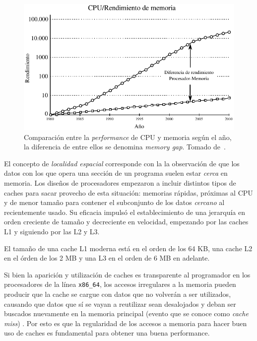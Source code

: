 \begin{figure}[htbp]
    \centering
    \includegraphics[width=\plotwidth]{images/cpu_vs_memory_ES.pdf}
    \caption{Comparaci\'on entre la \textit{performance} de CPU y memoria seg\'un el a\~no, la diferencia de entre ellos se denomina \textit{memory gap}. Tomado de~\cite{HennessyPatterson}.}
    \label{fig:cpu_vs_mem}
\end{figure}

El concepto de \textit{localidad espacial} corresponde con la la observaci\'on de que los datos con los que opera una secci\'on de un programa suelen estar \emph{cerca} en memoria.
Los dise\~nos de procesadores empezaron a incluir distintos tipos de caches para sacar provecho de esta situaci\'on: memorias r\'apidas, pr\'oximas al CPU y de menor tama\~no para contener el subconjunto de los datos \emph{cercano} al recientemente usado.
Su eficacia impuls\'o el establecimiento de una jerarqu\'ia en orden creciente de tama\~no y decreciente en velocidad, empezando por las caches L1 y siguiendo por las L2 y L3.

El tama\~no de una cache L1 moderna est\'a en el orden de los 64 KB, una cache L2 en el \'orden de los 2 MB y una L3 en el orden de 6 MB en adelante.

Si bien la aparici\'on y utilizaci\'on de caches es transparente al programador en los procesadores de la l\'inea \texttt{x86\_64}, los accesos irregulares a la memoria pueden
producir que la cache se cargue con datos que no volver\'an a ser utilizados, causando que datos que s\'i se vayan a reutilizar sean desalojados y deban ser buscados
nuevamente en la memoria principal (evento que se conoce como \textit{cache miss})
.
Por esto es que la regularidad de los accesos a memoria para hacer buen uso de caches es fundamental para obtener una buena performance.


